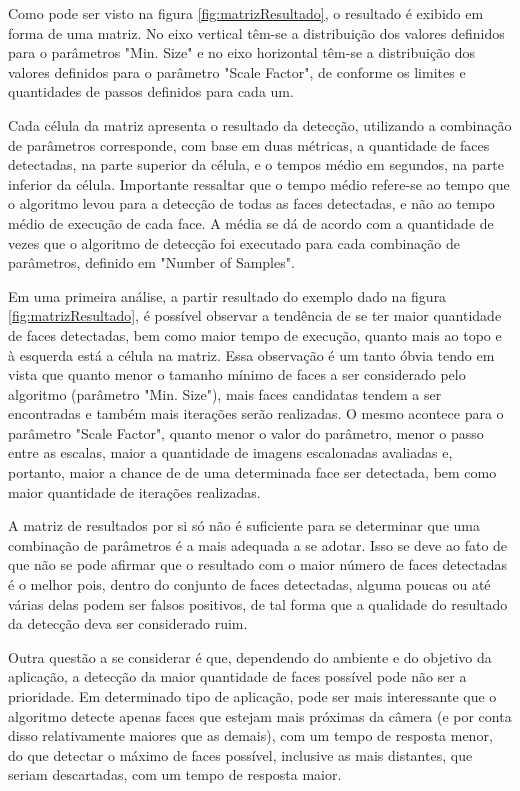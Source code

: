 Como pode ser visto na figura \ref{fig:matrizResultado}, o resultado é exibido em forma de uma matriz. No eixo vertical têm-se a distribuição dos valores definidos para o parâmetros "Min. Size" e no eixo horizontal têm-se a distribuição dos valores definidos para o parâmetro "Scale Factor", de conforme os limites e quantidades de passos definidos para cada um.

Cada célula da matriz apresenta o resultado da detecção, utilizando a combinação de parâmetros corresponde, com base em duas métricas, a quantidade de faces detectadas, na parte superior da célula, e o tempos médio em segundos, na parte inferior da célula. Importante ressaltar que o tempo médio refere-se ao tempo que o algoritmo levou para a detecção de todas as faces detectadas, e não ao tempo médio de execução de cada face. A média se dá de acordo com a quantidade de vezes que o algoritmo de detecção foi executado para cada combinação de parâmetros, definido em "Number of Samples".

Em uma primeira análise, a partir resultado do exemplo dado na figura \ref{fig:matrizResultado}, é possível observar a tendência de se ter maior quantidade de faces detectadas, bem como maior tempo de execução, quanto mais ao topo e à esquerda está a célula na matriz. Essa observação é um tanto óbvia tendo em vista que quanto menor o tamanho mínimo de faces a ser considerado pelo algoritmo (parâmetro "Min. Size"), mais faces candidatas tendem a ser encontradas e também mais iterações serão realizadas. O mesmo acontece para o parâmetro "Scale Factor", quanto menor o valor do parâmetro, menor o passo entre as escalas, maior a quantidade de imagens escalonadas avaliadas e, portanto, maior a chance de de uma determinada face ser detectada, bem como maior quantidade de iterações realizadas.

A matriz de resultados por si só não é suficiente para se determinar que uma combinação de parâmetros é a mais adequada a se adotar. Isso se deve ao fato de que não se pode afirmar que o resultado com o maior número de faces detectadas é o melhor pois, dentro do conjunto de faces detectadas, alguma poucas ou até várias delas podem ser falsos positivos, de tal forma que a qualidade do resultado da detecção deva ser considerado ruim. 

Outra questão a se considerar é que, dependendo do ambiente e do objetivo da aplicação, a detecção da maior quantidade de faces possível pode não ser a prioridade. Em determinado tipo de aplicação, pode ser mais interessante que o algoritmo detecte apenas faces que estejam mais próximas da câmera (e por conta disso relativamente maiores que as demais), com um tempo de resposta menor, do que detectar o máximo de faces possível, inclusive as mais distantes, que seriam descartadas, com um tempo de resposta maior.

